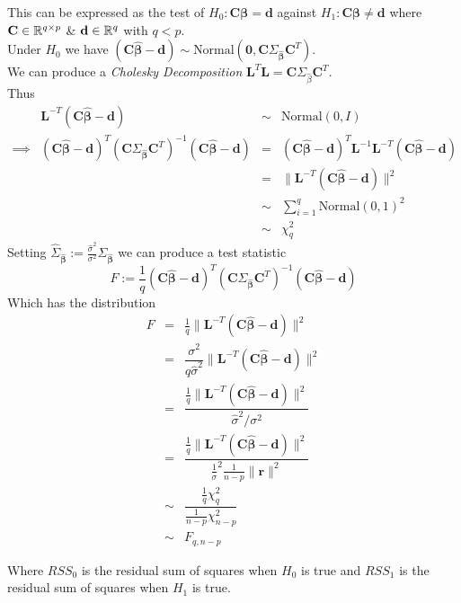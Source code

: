 \documentclass[11pt,a4paper]{article}
\begin{document}
This can be expressed as the test of $H_0:\textbf{C}\pmb\beta=\textbf{d}$ against $H_1:\textbf{C}\pmb\beta\neq\textbf{d}$ where $\textbf{C}\in\mathbb{R}^{q\times p}$ \& $\textbf{d}\in\mathbb{R}^q$ with $q<p$.\\
Under $H_0$ we have $(\textbf{C}\hat{\pmb\beta}-\textbf{d})\sim\text{Normal}(\pmb0,\textbf{C}\Sigma_{\hat{\pmb\beta}}\textbf{C}^T)$.\\
We can produce a \textit{Cholesky Decomposition} $\textbf{L}^T\textbf{L}=\textbf{C}\Sigma_{\hat\beta}\textbf{C}^T$.\\
Thus
\[\begin{array}{rrcl}
&\textbf{L}^{-T}(\textbf{C}\hat{\pmb\beta}-\textbf{d})&\sim&\text{Normal}(0,I)\\
\implies&(\textbf{C}\hat{\pmb\beta}-\textbf{d})^T(\textbf{C}\Sigma_{\hat{\pmb\beta}}\textbf{C}^T)^{-1}(\textbf{C}\hat{\pmb\beta}-\textbf{d})&=&(\textbf{C}\hat{\pmb\beta}-\textbf{d})^T\textbf{L}^{-1}\textbf{L}^{-T}(\textbf{C}\hat{\pmb\beta}-\textbf{d})\\
&&=&\|\textbf{L}^{-T}(\textbf{C}\hat{\pmb\beta}-\textbf{d})\|^2\\
&&\sim&\displaystyle\sum_{i=1}^q\text{Normal}(0,1)^2\\
&&\sim&\chi^2_q
\end{array}\]
Setting $\hat\Sigma_{\hat{\pmb\beta}}:=\frac{\hat\sigma^2}{\sigma^2}\Sigma_{\hat{\pmb\beta}}$ we can produce a test statistic
$$F:=\frac1q(\textbf{C}\hat{\pmb\beta}-\textbf{d})^T(\textbf{C}\Sigma_{\hat{\pmb\beta}}\textbf{C}^T)^{-1}(\textbf{C}\hat{\pmb\beta}-\textbf{d})$$
Which has the distribution
\[\begin{array}{rcl}
F&=&\frac1q\|\textbf{L}^{-T}(\textbf{C}\hat{\pmb\beta}-\textbf{d})\|^2\\
&=&\dfrac{\sigma^2}{q\hat\sigma^2}\|\textbf{L}^{-T}(\textbf{C}\hat{\pmb\beta}-\textbf{d})\|^2\\
&=&\dfrac{\frac1q\|\textbf{L}^{-T}(\textbf{C}\hat{\pmb\beta}-\textbf{d})\|^2}{\hat\sigma^2/\sigma^2}\\
&=&\dfrac{\frac1q\|\textbf{L}^{-T}(\textbf{C}\hat{\pmb\beta}-\textbf{d})\|^2}{\frac1\sigma^2\frac1{n-p}\|\textbf{r}\|^2}\\
&\sim&\dfrac{\frac1q\chi^2_q}{\frac1{n-p}\chi^2_{n-p}}\\
&\sim&F_{q,n-p}
\end{array}\]

Where $RSS_0$ is the residual sum of squares when $H_0$ is true and $RSS_1$ is the residual sum of squares when $H_1$ is true.\\
\end{document}

